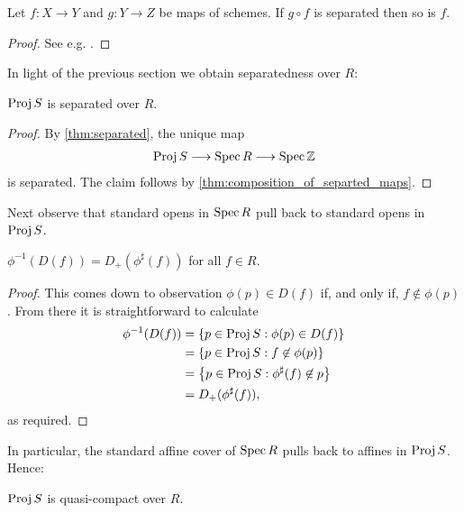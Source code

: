 \documentclass{article}
\begin{document}
\begin{lemma}\label{thm:composition_of_separted_maps}
  Let $f:X\to Y$ and $g:Y\to Z$ be maps of schemes. If $g\circ f$ is
  separated then so is $f$.
  \begin{proof}
    See e.g. {\cite[\href{https://stacks.math.columbia.edu/tag/01KV}{Tag 01KV}]{stacks-project}}.
  \end{proof}
\end{lemma}

In light of the previous section we obtain separatedness
over $R$:

\begin{corollary}
  $\operatorname{Proj} S$ is separated over $R$.
  \begin{proof}
    By \ref{thm:separated}, the unique map
    \begin{align*}
      \operatorname{Proj} S \longrightarrow \operatorname{Spec} R \longrightarrow \operatorname{Spec}\mathbb{Z}
    \end{align*}
    is separated. The claim follows by \ref{thm:composition_of_separted_maps}.
  \end{proof}
\end{corollary}

Next observe that standard opens in $\operatorname{Spec} R$ pull back to
standard opens in $\operatorname{Proj} S$.

\begin{lemma}
  ${\phi}^{-1}(D(f))=D_+(\phi^\sharp(f))$ for all $f\in R$.
  \begin{proof}
    This comes down to observation $\phi(p)\in D(f)$
    if, and only if, $f\not\in\phi(p)$. From there it is
    straightforward to calculate
    \begin{align*}
      {\phi}^{-1}(D(f))
      &= \left\lbrace{p\in\operatorname{Proj}S : \phi(p) \in D(f)}\right\rbrace \\
      &= \left\lbrace{p\in\operatorname{Proj}S : f\not\in\phi(p)}\right\rbrace \\
      &= \left\lbrace{p\in\operatorname{Proj}S : \phi^\sharp(f)\not\in p}\right\rbrace \\
      &= D_+(\phi^\sharp(f)),
    \end{align*}
    as required.
  \end{proof}
\end{lemma}

In particular, the standard affine cover of $\operatorname{Spec} R$ pulls back to
affines in $\operatorname{Proj} S$. Hence:

\begin{corollary}\label{thm:quasi_compact}
  $\operatorname{Proj} S$ is quasi-compact over $R$.
\end{corollary}
\end{document}
